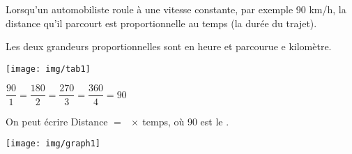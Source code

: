 
\begin{myex}

Lorsqu'un automobiliste roule à une vitesse constante, par exemple 90 km/h, la distance qu'il parcourt est proportionnelle au temps (la durée du trajet).

Les deux grandeurs proportionnelles sont  en heure et  parcourue e kilomètre.

\begin{multicols}{2}
	\texttt{[image: img/tab1]}
	
	
	{\center $\dfrac{90}{1}=\dfrac{180}{2}=\dfrac{270}{3}=\dfrac{360}{4}=90$}
\end{multicols}	
	
	On peut écrire Distance $=$ $ \: \times \:$temps, où 90 est le .
	
	\mysp
	
	\begin{center}
		\texttt{[image: img/graph1]}
	\end{center}
\end{myex}